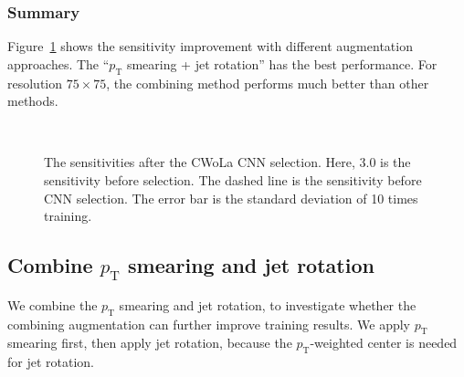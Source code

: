 \documentclass[12pt]{article}
\begin{document}
        \subsubsection{Summary}%
        \label{subs:summary}
            Figure~\ref{fig:sensitivity_improvement_summary_aug_SB_3} shows the sensitivity improvement with different augmentation approaches. The ``$p_{\text{T}}$ smearing + jet rotation'' has the best performance. For resolution $75\times 75$, the combining method performs much better than other methods.
            \begin{figure}[htpb]
                \centering
                 \\
                \caption{The sensitivities after the CWoLa CNN selection. Here, $3.0$ is the sensitivity before selection. The dashed line is the sensitivity before CNN selection. The error bar is the standard deviation of 10 times training.}
                \label{fig:sensitivity_improvement_summary_aug_SB_3}
            \end{figure}
    \subsection{Combine \texorpdfstring{$p_{\mathrm{T}}$}{pT} smearing and jet rotation}%
    \label{sub:combine_pt_smearing_and_jet_rotation}
        We combine the $p_{\text{T}}$ smearing and jet rotation, to investigate whether the combining augmentation can further improve training results. We apply $p_{\text{T}}$ smearing first, then apply jet rotation, because the $p_{\text{T}}$-weighted center is needed for jet rotation.
\end{document}
